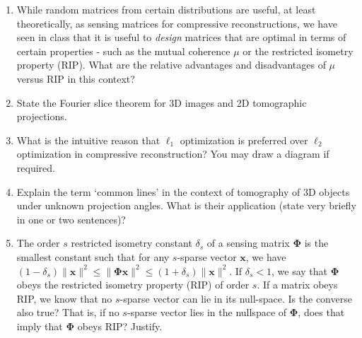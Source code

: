 \documentclass[12pt]{article}
\begin{document}
\begin{enumerate}
\item While random matrices from certain distributions are useful, at least theoretically, as sensing matrices for compressive reconstructions, we have seen in class that it is useful to \emph{design} matrices that are optimal in terms of certain properties - such as the mutual coherence $\mu$ or the restricted isometry property (RIP). What are the relative advantages and disadvantages of $\mu$ versus RIP in this context?

\item State the Fourier slice theorem for 3D images and 2D tomographic projections. 

\item What is the intuitive reason that $\ell_1$ optimization is preferred over $\ell_2$ optimization in compressive reconstruction? You may draw a diagram if required. 

\item Explain the term `common lines' in the context of tomography of 3D objects under unknown projection angles. What is their application (state very briefly in one or two sentences)?

\item The order $s$ restricted isometry constant $\delta_s$ of a sensing matrix $\boldsymbol{\Phi}$ is the smallest constant such that for any $s$-sparse vector $\boldsymbol{x}$, we have $(1-\delta_s) \|\boldsymbol{x}\|^2 \leq \|\boldsymbol{\Phi x}\|^2 \leq (1+\delta_s) \|\boldsymbol{x}\|^2$. If $\delta_s < 1$, we say that $\boldsymbol{\Phi}$ obeys the restricted isometry property (RIP) of order $s$. If a matrix obeys RIP, we know that no $s$-sparse vector can lie in its null-space. Is the converse also true? That is, if no $s$-sparse vector lies in the nullspace of $\boldsymbol{\Phi}$, does that imply that $\boldsymbol{\Phi}$ obeys RIP? Justify.
\end{enumerate}
\end{document}
